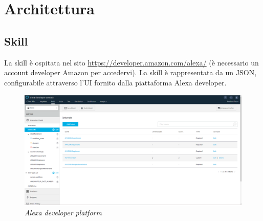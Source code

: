 \chapter{Architettura}
\section{Skill}\label{architetturaSkill}
La skill è ospitata nel sito \url{https://developer.amazon.com/alexa/} (è necessario un account developer Amazon per accedervi). La skill è rappresentata da un JSON, configurabile attraverso l'UI fornito dalla piattaforma Alexa developer.
\begin{figure} [H]
    \centering
	\includegraphics[scale=0.2]{./images/SkillPage.PNG}
	\caption{\textit{Alexa developer platform}}\label{classlambda}
\end{figure}


